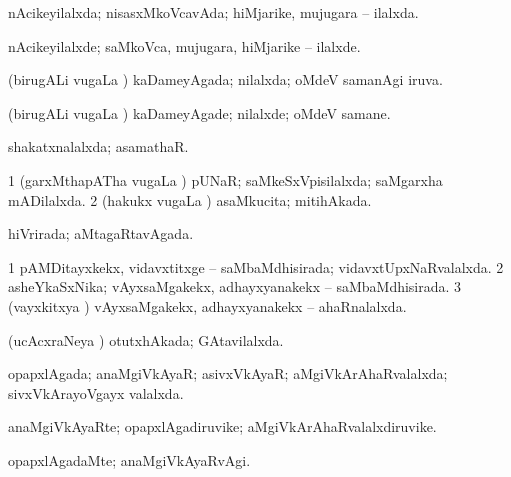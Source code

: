 \bentry
{}
\gl{\saMkiSx}
\expl{}
\bmng
{} 
\emng
\eentry

\bentry
{} 
\gl{\gu}
\expl{}
\bmng
nAcikeyilalxda; nisasxMkoVcavAda; hiMjarike, mujugara -- ilalxda. 
\emng
\eentry

\bentry
{} 
\gl{\kirxvi}
\expl{}
\bmng
nAcikeyilalxde; saMkoVca, mujugara, hiMjarike -- ilalxde. 
\emng
\eentry

\bentry
{} 
\gl{\gu}
\expl{}
\bmng
(birugALi \mo vugaLa \vi) kaDameyAgada; nilalxda; oMdeV samanAgi iruva. 
\emng
\eentry

\bentry
{} 
\gl{\kirxvi}
\expl{}
\bmng
(birugALi \mo vugaLa \vi) kaDameyAgade; nilalxde; oMdeV samane. 
\emng
\eentry

\bentry
{} 
\gl{\gu}
\expl{}
\bmng
shakatxnalalxda; asamathaR. 
\emng
\eentry

\bentry
{} 
\gl{\gu}
\expl{}
\bmng
\bnum
\num{1} (garxMthapATha \mo vugaLa \vi) pUNaR; saMkeSxVpisilalxda; saMgarxha mADilalxda. 
\num{2} (hakukx \mo vugaLa \vi) asaMkucita; mitihAkada. 
\enum
\emng
\eentry

\bentry
{} 
\gl{\gu}
\expl{}
\bmng
hiVrirada; aMtagaRtavAgada. 
\emng
\eentry

\bentry
{} 
\gl{\gu}
\expl{}
\bmng
\bnum
\num{1} pAMDitayxkekx, vidavxtitxge -- saMbaMdhisirada; vidavxtUpxNaRvalalxda. 
\num{2} asheYkaSxNika; vAyxsaMgakekx, adhayxyanakekx -- saMbaMdhisirada. 
\num{3} (vayxkitxya \vi) vAyxsaMgakekx, adhayxyanakekx -- ahaRnalalxda. 
\enum
\emng
\eentry

\bentry
{} 
\gl{\gu}
\expl{}
\bmng
(ucAcxraNeya \vi) otutxhAkada; GAtavilalxda. 
\emng
\eentry

\bentry
{} 
\gl{\gu}
\expl{}
\bmng
opapxlAgada; anaMgiVkAyaR; asivxVkAyaR; aMgiVkArAhaRvalalxda; sivxVkArayoVgayx valalxda. 
\emng
\eentry

\bentry
{} 
\gl{\nA}
\expl{}
\bmng
anaMgiVkAyaRte; opapxlAgadiruvike; aMgiVkArAhaRvalalxdiruvike. 
\emng
\eentry

\bentry
{} 
\gl{\kirxvi}
\expl{}
\bmng
opapxlAgadaMte; anaMgiVkAyaRvAgi. 
\emng
\eentry

